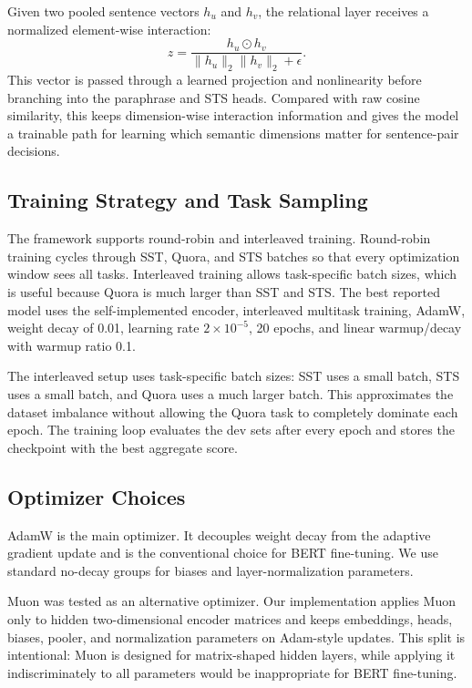 \documentclass{article}
\begin{document}
Given two pooled sentence vectors $h_u$ and $h_v$, the relational layer receives a normalized element-wise interaction:
\[
z = \frac{h_u \odot h_v}{\|h_u\|_2\|h_v\|_2+\epsilon}.
\]
This vector is passed through a learned projection and nonlinearity before branching into the paraphrase and STS heads. Compared with raw cosine similarity, this keeps dimension-wise interaction information and gives the model a trainable path for learning which semantic dimensions matter for sentence-pair decisions.

\subsection{Training Strategy and Task Sampling}

The framework supports round-robin and interleaved training. Round-robin training cycles through SST, Quora, and STS batches so that every optimization window sees all tasks. Interleaved training allows task-specific batch sizes, which is useful because Quora is much larger than SST and STS. The best reported model uses the self-implemented encoder, interleaved multitask training, AdamW, weight decay of 0.01, learning rate $2\times 10^{-5}$, 20 epochs, and linear warmup/decay with warmup ratio 0.1.

The interleaved setup uses task-specific batch sizes: SST uses a small batch, STS uses a small batch, and Quora uses a much larger batch. This approximates the dataset imbalance without allowing the Quora task to completely dominate each epoch. The training loop evaluates the dev sets after every epoch and stores the checkpoint with the best aggregate score.

\subsection{Optimizer Choices}

AdamW is the main optimizer. It decouples weight decay from the adaptive gradient update and is the conventional choice for BERT fine-tuning. We use standard no-decay groups for biases and layer-normalization parameters.

Muon was tested as an alternative optimizer. Our implementation applies Muon only to hidden two-dimensional encoder matrices and keeps embeddings, heads, biases, pooler, and normalization parameters on Adam-style updates. This split is intentional: Muon is designed for matrix-shaped hidden layers, while applying it indiscriminately to all parameters would be inappropriate for BERT fine-tuning.
\end{document}
